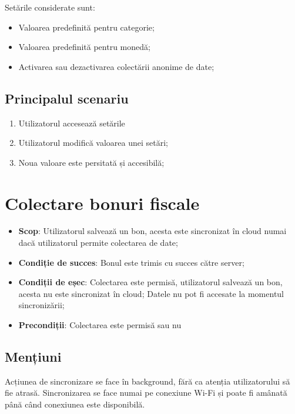 Setările considerate sunt:

\begin{itemize}
\item
  Valoarea predefinită pentru categorie;
\item
  Valoarea predefinită pentru monedă;
\item
  Activarea sau dezactivarea colectării anonime de date;
\end{itemize}

\subsection{Principalul scenariu}\label{principalul-scenariu-2}

\begin{enumerate}
\item
  Utilizatorul accesează setările
\item
  Utilizatorul modifică valoarea unei setări;
\item
  Noua valoare este persitată și accesibilă;
\end{enumerate}

\section{Colectare bonuri fiscale}\label{colectare-bonuri-fiscale}

\begin{itemize}
\item
  \textbf{Scop}: Utilizatorul salvează un bon, acesta este sincronizat în cloud numai dacă utilizatorul permite colectarea de date;
\item
  \textbf{Condiție de succes}: Bonul este trimis cu succes către server;
\item
  \textbf{Condiții de eșec}: Colectarea este permisă, utilizatorul salvează un bon, acesta nu este sincronizat în cloud; Datele nu pot fi accesate la momentul sincronizării;
\item
  \textbf{Precondiții}: Colectarea este permisă sau nu
\end{itemize}

\subsection{Mențiuni}\label{menux21biuni-2}

Acțiunea de sincronizare se face în background, fără ca atenția utilizatorului să fie atrasă. Sincronizarea se face numai pe conexiune Wi-Fi și poate fi amânată până când conexiunea este disponibilă.

